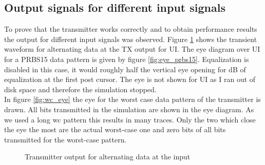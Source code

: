 \subsection{Output signals for different input signals}

To prove that the transmitter works correctly and to obtain performance results the output for different input signals was observed. Figure \ref{fig:alternating_data} shows the transient waveform for alternating data at the TX output for \unit[6]{UI}. The eye diagram over \unit[2940]{UI} for a PRBS15 data pattern is given by figure \ref{fig:eye_prbs15}. Equalization is disabled in this case, it would roughly half the vertical eye opening for \unit[6]{dB} of equalization at the first post cursor. The eye is not shown for \unit[10000]{UI} as I ran out of disk space and therefore the simulation stopped.\\
In figure \ref{fig:wc_eye} the eye for the worst case data pattern of the transmitter is drawn. All bits transmitted in the simulation are shown in the eye diagram. As we used a long wc pattern this results in many traces. Only the two which close the eye the most are the actual worst-case one and zero bits of all bits transmitted for the worst-case pattern.

\begin{figure}[H]
  \centering
  \caption{Transmitter output for alternating data at the input}
  \label{fig:alternating_data}
\end{figure}

